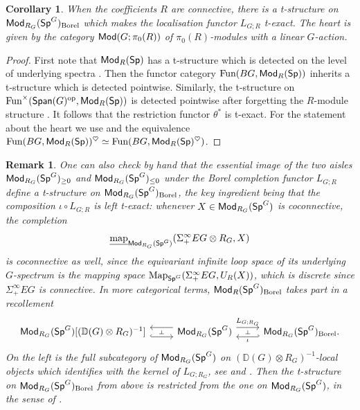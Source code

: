 \documentclass[reqno]{amsart}
\numberwithin{equation}{section}\theoremstyle{thms}
\newtheorem{cor}[equation]{Corollary}
\theoremstyle{defn}
\newtheorem{rem}[equation]{Remark}
\newcommand{\bD}{\mathbb{D}}
\newcommand{\tn}[1]{\textnormal{#1}}
\newcommand{\tsf}[1]{\textsf{\textup{#1}}}
\newcommand{\underl}[1]{\underline{#1}}
\newcommand{\op}{\tn{op}}
\newcommand{\fun}{\tn{Fun}}
\newcommand{\Map}{\tn{Map}}
\newcommand{\imap}{\underl{\tn{map}}}
\newcommand{\Mod}{\tsf{Mod}}
\newcommand{\Spans}{\tsf{Span}}
\newcommand{\spec}{\tsf{Sp}}
\newcommand{\specg}{\tsf{Sp}^G}
\begin{document}
\begin{cor}\label{cor:tstructureonborelcomplete}
When the coefficients $R$ are connective, there is a t-structure on $\Mod_{R_G}(\specg)_{\tn{Borel}}$ which makes the localisation functor $L_{G;R}$ t-exact. The heart is given by the category $\Mod(G;\pi_0(R))$ of $\pi_0(R)$-modules with a linear $G$-action. 
\end{cor}
\begin{proof}
First note that $\Mod_R(\spec)$ has a t-structure which is detected on the level of underlying spectra \cite[Proposition 7.1.1.13]{lur17}. Then the functor category $\fun(BG,\Mod_R(\spec))$ inherits a t-structure which is detected pointwise. Similarly, the t-structure on $\fun^{\times}(\Spans(G)^{\op},\Mod_R(\spec))$ is detected pointwise after forgetting the $R$-module structure \cite[§6]{bgs20}. It follows that the restriction functor $\theta^*$ is t-exact. For the statement about the heart we use \cite[Proposition 7.1.1.13]{lur17} and the equivalence $\fun(BG,\Mod_R(\spec))^{\heartsuit} \simeq \fun(BG,\Mod_R(\spec)^{\heartsuit})$.
\end{proof}

\begin{rem}
One can also check by hand that the essential image of the two aisles $\Mod_{R_G}(\spec^{G})_{\geq 0}$ and $\Mod_{R_G}(\spec^{G})_{\leq 0}$ under the Borel completion functor $L_{G;R}$ define a t-structure on $\Mod_{R_G}(\spec^{G})_{\tn{Borel}}$, the key ingredient being that the composition $\iota\circ L_{G;R}$ is left t-exact: whenever $X \in \Mod_{R_G}(\spec^{G})$ is coconnective, the completion 
$$\imap_{\Mod_{R_G}(\specg)}(\Sigma^{\infty}_+EG \otimes R_G, X)$$
is coconnective as well, since the equivariant infinite loop space of its underlying $G$-spectrum is the mapping space $\Map_{\specg}(\Sigma^{\infty}_+EG, U_R(X))$, which is discrete since $\Sigma^{\infty}_+EG$ is connective.
In more categorical terms, $\Mod_R(\specg)_{\tn{Borel}}$ takes part in a recollement \cite[Definition A.8.1, Remark A.8.19]{lur17}
\[\begin{tikzcd}
	{\Mod_{R_G}(\specg)[(\bD(G)\otimes R_G)^{-1}]} & {\Mod_{R_G}(\spec^{G})} & {\Mod_{R_G}(\specg)_{\tn{Borel}}.}
	\arrow[""{name=0, anchor=center, inner sep=0}, shift right=2, hook, from=1-1, to=1-2]
	\arrow[""{name=1, anchor=center, inner sep=0}, shift right=2, from=1-2, to=1-1]
	\arrow[""{name=2, anchor=center, inner sep=0}, "{L_{G;R_G}}", shift left=2, from=1-2, to=1-3]
	\arrow[""{name=3, anchor=center, inner sep=0}, "{\iota}", shift left=2, hook', from=1-3, to=1-2]
	\arrow["\dashv"{anchor=center, rotate=-90}, draw=none, from=2, to=3]
	\arrow["\dashv"{anchor=center, rotate=-90}, draw=none, from=1, to=0]
\end{tikzcd}\]
On the left is the full subcategory of $\Mod_{R_G}(\spec^{G})$ on $(\bD(G)\otimes R_G)^{-1}$-local objects which identifies with the kernel of $L_{G;R_G}$, see \cite[Proposition 3.11]{mnn17} and \cite[§1]{npr24}. Then the t-structure on $\Mod_{R_G}(\specg)_{\tn{Borel}}$ from above is restricted from the one on $\Mod_{R_G}(\spec^{G})$, in the sense of \cite[Proposition 1.4.12]{bbd81}.
\end{rem}
\end{document}
